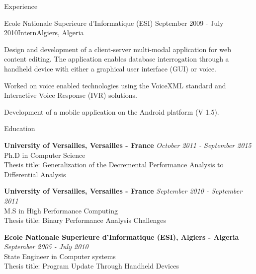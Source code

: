 \documentclass{resume} %
\begin{document}
\begin{rSection}{Experience}
\begin{rSubsection}{Ecole Nationale Superieure d'Informatique (ESI)}
                   {September 2009 - July 2010}{Intern}{Algiers, Algeria}
\item Design and development of a client-server multi-modal application for web 
      content editing. The application enables database interrogation through a 
      handheld device with either a graphical user interface (GUI) or voice.
\item Worked on voice enabled technologies using the VoiceXML standard and 
      Interactive Voice Response (IVR) solutions.
\item Development of a mobile application on the Android platform (V 1.5).  
\end{rSubsection}

\newpage

\begin{rSection}{Education}

{\bf University of Versailles, Versailles - France} \hfill {\em October 2011 - September 2015} \\ 
Ph.D in Computer Science\\
Thesis title: Generalization of the Decremental Performance Analysis to Differential Analysis

{\bf University of Versailles, Versailles - France} \hfill {\em September 2010 - September 2011} \\ 
M.S in High Performance Computing\\
Thesis title: Binary Performance Analysis Challenges

{\bf Ecole Nationale Superieure d'Informatique (ESI), Algiers - Algeria} \hfill {\em September 2005 - July 2010} \\ 
State Engineer in Computer systems\\
Thesis title: Program Update Through Handheld Devices 
\end{rSection}





\end{rSection}
\end{document}
